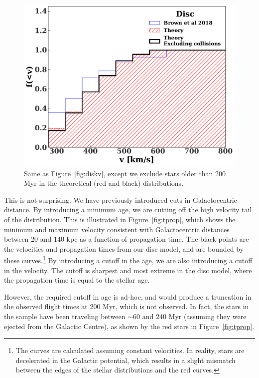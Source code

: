\documentclass[fleqn,usenatbib]{mnras}
\begin{document}
\begin{figure}
    \includegraphics[width=\columnwidth]{figures/vcomp_disk_1_tmin200.0.pdf}
    \caption{Same as Figure~\ref{fig:diskv}, except we exclude stars older than 200 Myr in the theoretical (red and black) distributions.}
    \label{fig:age_cut}
\end{figure}

This is not surprising. We have previously introduced cuts in Galactocentric distance. By introducing a minimum age, we are cutting off the high velocity tail of the distribution. This is illustrated in Figure~\ref{fig:tprop}, which shows the minimum and maximum velocity consistent with Galactocentric distances between 20 and 140 kpc as a function of propagation time. The black points are the velocities and propagation times from our disc model, and are bounded by these curves.\footnote{The curves are calculated assuming constant velocities. In reality, stars are decelerated in the Galactic potential, which results in a slight mismatch between the edges of the stellar distributions and the red curves.} By introducing a cutoff in the age, we are also introducing a cutoff in the velocity. 
The cutoff is sharpest and most extreme in the disc model, where the propagation time is equal to the stellar age. 

However, the required cutoff in age is ad-hoc, and would produce a truncation in the observed flight times at 200 Myr, which is not observed. In fact, the stars in the \citet{warren_brown+2018} sample have been traveling between $\sim 60$ and $240$ Myr (assuming they were ejected from the Galactic Centre), as shown by the red stars in Figure~\ref{fig:tprop}.
\end{document}
